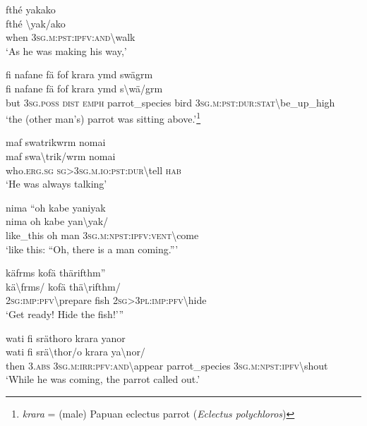 \ea\label{ex:3:a7537}
fthé yakako\\
\gll fthé	{\textbackslash}yak/ako\\
     when	3\textsc{sg}.\textsc{m}:\textsc{pst}:\textsc{ipfv}:\textsc{and}{\textbackslash}walk\\
\glt `As he was making his way,'
\z

\ea\label{ex:3:a7538}
fi nafane fä fof krara ymd swägrm\\
\gll fi	nafane	fä	fof	krara	ymd	s{\textbackslash}wä/grm\\
     but	3\textsc{sg}.\textsc{poss}	\textsc{dist}	\textsc{emph}	parrot\_species	bird	3\textsc{sg}.\textsc{m}:\textsc{pst}:\textsc{dur}:\textsc{stat}{\textbackslash}be\_up\_high\\
\glt `the (other man's) parrot was sitting above.'\footnote{\textit{krara} = (male) Papuan eclectus parrot (\textit{Eclectus polychloros})}
\z

\ea\label{ex:3:a7540}
maf swatrikwrm nomai\\
\gll maf	swa{\textbackslash}trik/wrm	nomai\\
     who.\textsc{erg}.\textsc{sg}	\textsc{sg}>3\textsc{sg}.\textsc{m}.\textsc{io}:\textsc{pst}:\textsc{dur}{\textbackslash}tell	\textsc{hab}\\
\glt `He was always talking'
\z

\ea\label{ex:3:a7541}
nima ``oh kabe yaniyak\\
\gll nima	oh	kabe	yan{\textbackslash}yak/\\
     like\_this	oh	man	3\textsc{sg}.\textsc{m}:\textsc{npst}:\textsc{ipfv}:\textsc{vent}{\textbackslash}come\\
\glt `like this: ``Oh, there is a man coming.'''
\z

\ea\label{ex:3:a7542}
käfrms kofä thärifthm''\\
\gll kä{\textbackslash}frms/	kofä	thä{\textbackslash}rifthm/\\
     2\textsc{sg}:\textsc{imp}:\textsc{pfv}{\textbackslash}prepare	fish	2\textsc{sg}>3\textsc{pl}:\textsc{imp}:\textsc{pfv}{\textbackslash}hide\\
\glt `Get ready! Hide the fish!'''
\z

\ea\label{ex:3:a7543}
wati fi sräthoro krara yanor\\
\gll wati	fi	srä{\textbackslash}thor/o	krara	ya{\textbackslash}nor/\\
     then	3.\textsc{abs}	3\textsc{sg}.\textsc{m}:\textsc{irr}:\textsc{pfv}:\textsc{and}{\textbackslash}appear	parrot\_species	3\textsc{sg}.\textsc{m}:\textsc{npst}:\textsc{ipfv}{\textbackslash}shout\\
\glt `While he was coming, the parrot called out.'
\z

